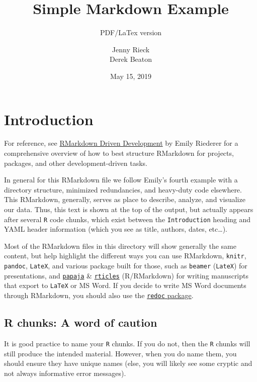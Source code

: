 \documentclass[]{article}
\title{Simple Markdown Example}
\subtitle{PDF/LaTex version}
\author{Jenny Rieck \\ Derek Beaton}
\date{May 15, 2019}
\begin{document}
\maketitle

\hypertarget{introduction}{%
\section{Introduction}\label{introduction}}

For reference, see
\href{https://emilyriederer.netlify.com/post/rmarkdown-driven-development/}{RMarkdown
Driven Development} by Emily Riederer for a comprehensive overview of
how to best structure RMarkdown for projects, packages, and other
development-driven tasks.

In general for this RMarkdown file we follow Emily's fourth example with
a directory structure, minimized redundancies, and heavy-duty code
elsewhere. This RMarkdown, generally, serves as place to describe,
analyze, and visualize our data. Thus, this text is shown at the top of
the output, but actually appears after several \texttt{R} code chunks,
which exist between the \texttt{Introduction} heading and YAML header
information (which you see as title, authors, dates, etc\ldots{}).

Most of the RMarkdown files in this directory will show generally the
same content, but help highlight the different ways you can use
RMarkdown, \texttt{knitr}, \texttt{pandoc}, \texttt{LateX}, and various
package built for those, such as \texttt{beamer} (\texttt{LateX}) for
presentations, and
\href{https://github.com/crsh/papaja}{\texttt{papaja}} \&
\href{https://github.com/rstudio/rticles}{\texttt{rticles}}
(R/RMarkdown) for writing manuscripts that export to \texttt{LaTeX} or
MS Word. If you decide to write MS Word documents through RMarkdown, you
should also use the
\href{https://github.com/noamross/redoc}{\texttt{redoc} package}.

\hypertarget{r-chunks-a-word-of-caution}{%
\subsection{R chunks: A word of
caution}\label{r-chunks-a-word-of-caution}}

It is good practice to name your \texttt{R} chunks. If you do not, then
the \texttt{R} chunks will still produce the intended material. However,
when you do name them, you should ensure they have unique names (else,
you will likely see some cryptic and not always informative error
messages).
\end{document}
